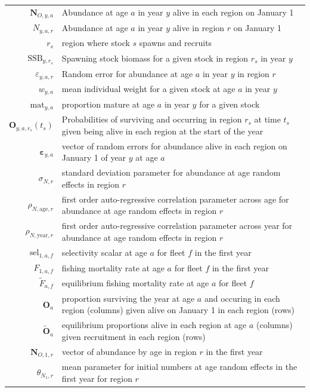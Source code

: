 \documentclass[
]{article}
\begin{document}
\begin{longtable}[c]{r p{}}
$\mathbf{N}_{O,y,a}$ & Abundance at age $a$ in year $y$ alive in each region on January 1\\
$N_{y,a,r}$ & Abundance at age $a$ in year $y$ alive in region $r$ on January 1\\
$r_s$ & region where stock $s$ spawns and recruits\\
$\text{SSB}_{y,r_s}$ & Spawning stock biomass for a given stock in region $r_s$ in year $y$\\
$\varepsilon_{y,a,r}$ & Random error for abundance at age $a$ in year $y$ in region $r$\\
$w_{y,a}$ & mean individual weight for a given stock at age $a$ in year $y$\\
$\text{mat}_{y,a}$ & proportion mature at age $a$ in year $y$ for a given stock\\
$\mathbf{O}_{y,a,r_s}(t_s)$ & Probabilities of surviving and occurring in region $r_s$ at time $t_s$ given being alive in each region at the start of the year\\
$\boldsymbol{\varepsilon}_{y,a}$ & vector of random errors for abundance alive in each region on January 1 of year $y$ at age $a$\\
$\sigma_{N,r}$ & standard deviation parameter for abundance at age random effects in region $r$\\
$\rho_{N,\text{age},r}$ & first order auto-regressive correlation parameter across age for abundance at age random effects in region $r$\\
$\rho_{N,\text{year},r}$ & first order auto-regressive correlation parameter across year for abundance at age random effects in region $r$\\
$\text{sel}_{1,a,f}$ & selectivity scalar at age $a$ for fleet $f$ in the first year\\
$F_{1,a,f}$ & fishing mortality rate at age $a$ for fleet $f$ in the first year\\
$\widetilde{F}_{a,f}$ & equilibrium fishing mortality rate at age $a$ for fleet $f$\\
$\mathbf{O}_{a}$ & proportion surviving the year at age $a$ and occuring in each region (columns) given alive on January 1 in each region (rows)\\
$\widetilde{\mathbf{O}}_{a}$ & equilibrium proportions alive in each region at age $a$ (columns) given recruitment in each region (rows)\\
$\mathbf{N}_{O,1,r}$ & vector of abundance by age in region $r$ in the first year\\
$\theta_{N_1,r}$ & mean parameter for initial numbers at age random effects in the first year for region $r$\\

\end{longtable}
\end{document}
